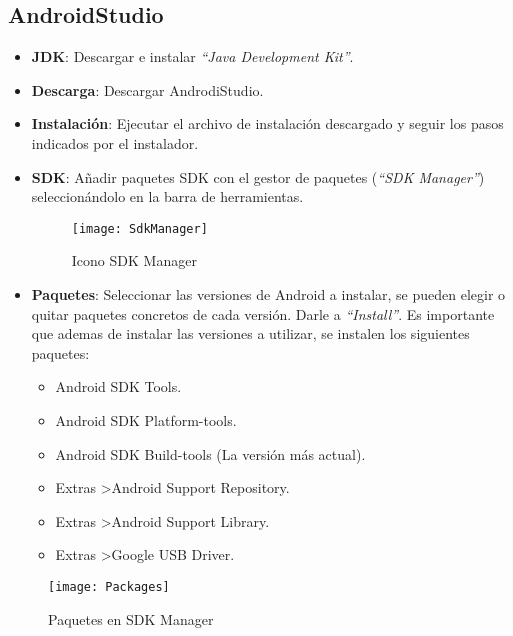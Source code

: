 	\subsection{AndroidStudio}
		\begin{itemize}
			\item {\bf JDK}: Descargar e instalar {\it ``Java Development Kit''}\cite{17:jdk:online}.
			\item {\bf Descarga}: Descargar AndrodiStudio\cite{13:androidstudiodescarga:online}.
			\item {\bf Instalación}: Ejecutar el archivo de instalación descargado y seguir los pasos indicados por el instalador.
			\item {\bf SDK}: Añadir paquetes SDK con el gestor de paquetes ({\em ``SDK Manager''}) seleccionándolo en la barra de herramientas.
				\begin{figure}[h]
					\centering
					\texttt{[image: SdkManager]}
					\caption{Icono SDK Manager}
					\label{fig:SdkManager}
				\end{figure}
			\item {\bf Paquetes}: Seleccionar las versiones de Android\cite{2:android:online} a instalar, se pueden elegir o quitar paquetes concretos de cada versión. Darle a {\em ``Install''}. Es importante que ademas de instalar las versiones a utilizar, se instalen los siguientes paquetes:
				\begin{itemize}
					\item Android SDK Tools.
					\item Android SDK Platform-tools.
					\item Android SDK Build-tools (La versión más actual).
					\item Extras \textgreater Android Support Repository.
					\item Extras \textgreater Android Support Library.
					\item Extras \textgreater Google USB Driver.
				\end{itemize}
		\end{itemize}
		
		\begin{figure}[h]
			\centering
			\texttt{[image: Packages]}
			\caption{Paquetes en SDK Manager}
			\label{fig:SdkManagerPackages}
		\end{figure}
		
	\newpage %
